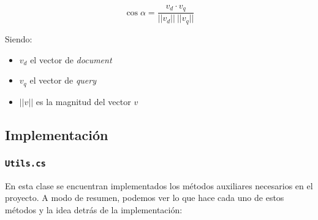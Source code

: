 \documentclass[a4paper, 12pt]{report}
\begin{document}
\begin{equation}
	\cos \alpha = \frac{v_d \cdot v_q}{||v_d|| ~ ||v_q||}
\end{equation}

Siendo:

\begin{itemize}
	\item $v_d$ el vector de {\it document}
	\item $v_q$ el vector de {\it query}
	\item $||v||$ es la magnitud del vector $v$
\end{itemize}

\subsection*{Implementación}

\subsubsection*{\tt Utils.cs}

En esta clase se encuentran implementados los métodos auxiliares necesarios en el proyecto.
A modo de resumen, podemos ver lo que hace cada uno de estos métodos y la idea detrás de la
implementación:
\end{document}

